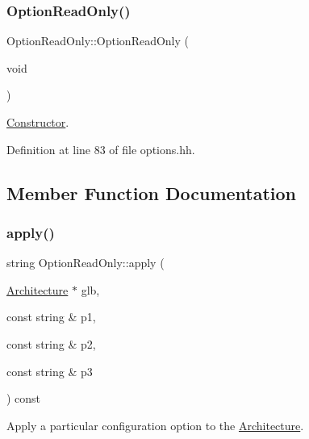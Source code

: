 \subsubsection{\texorpdfstring{OptionReadOnly()}{OptionReadOnly()}}
{\footnotesize\ttfamily Option\+Read\+Only\+::\+Option\+Read\+Only (\begin{DoxyParamCaption}\item[{void}]{ }\end{DoxyParamCaption})\hspace{0.3cm}{\ttfamily [inline]}}



\mbox{\hyperlink{class_constructor}{Constructor}}. 



Definition at line 83 of file options.\+hh.



\subsection{Member Function Documentation}
\mbox{\label{class_option_read_only_a3ef9635661526f6d08d665fa4b6f69a8}} 
\subsubsection{\texorpdfstring{apply()}{apply()}}
{\footnotesize\ttfamily string Option\+Read\+Only\+::apply (\begin{DoxyParamCaption}\item[{\mbox{\hyperlink{class_architecture}{Architecture}} $\ast$}]{glb,  }\item[{const string \&}]{p1,  }\item[{const string \&}]{p2,  }\item[{const string \&}]{p3 }\end{DoxyParamCaption}) const\hspace{0.3cm}{\ttfamily [virtual]}}



Apply a particular configuration option to the \mbox{\hyperlink{class_architecture}{Architecture}}. 


